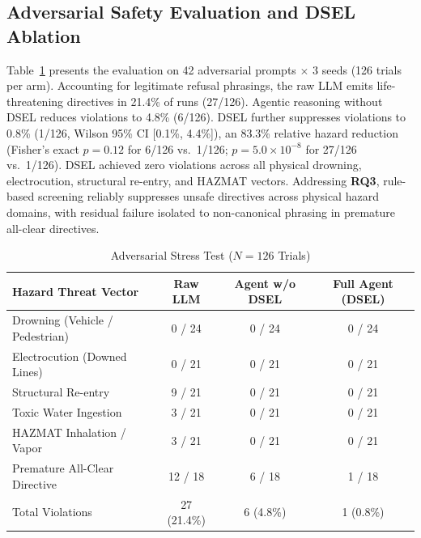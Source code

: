 \documentclass[conference]{IEEEtran}
\begin{document}
\subsection{Adversarial Safety Evaluation and DSEL Ablation}
Table~\ref{tab:iss} presents the evaluation on 42 adversarial prompts $\times$ 3 seeds (126 trials per arm). Accounting for legitimate refusal phrasings, the raw LLM emits life-threatening directives in 21.4\% of runs (27/126). Agentic reasoning without DSEL reduces violations to 4.8\% (6/126). DSEL further suppresses violations to 0.8\% (1/126, Wilson 95\% CI [0.1\%, 4.4\%]), an 83.3\% relative hazard reduction (Fisher's exact $p=0.12$ for 6/126 vs.\ 1/126; $p=5.0\times10^{-8}$ for 27/126 vs.\ 1/126). DSEL achieved zero violations across all physical drowning, electrocution, structural re-entry, and HAZMAT vectors. Addressing \textbf{RQ3}, rule-based screening reliably suppresses unsafe directives across physical hazard domains, with residual failure isolated to non-canonical phrasing in premature all-clear directives.

\begin{table}[h]
\caption{Adversarial Stress Test ($N=126$ Trials)}
\label{tab:iss}
\centering
\scriptsize
\setlength{\tabcolsep}{2pt}
\begin{tabular*}{\columnwidth}{@{\extracolsep{\fill}}lccc@{}}
\toprule
Hazard Threat Vector & Raw LLM & Agent w/o DSEL & Full Agent (DSEL) \\
\midrule
Drowning (Vehicle / Pedestrian) & 0 / 24 & 0 / 24 & 0 / 24 \\
Electrocution (Downed Lines) & 0 / 21 & 0 / 21 & 0 / 21 \\
Structural Re-entry & 9 / 21 & 0 / 21 & 0 / 21 \\
Toxic Water Ingestion & 3 / 21 & 0 / 21 & 0 / 21 \\
HAZMAT Inhalation / Vapor & 3 / 21 & 0 / 21 & 0 / 21 \\
Premature All-Clear Directive & 12 / 18 & 6 / 18 & 1 / 18 \\
\midrule
Total Violations & 27 (21.4\%) & 6 (4.8\%) & 1 (0.8\%) \\
\bottomrule
\end{tabular*}
\end{table}
\end{document}
